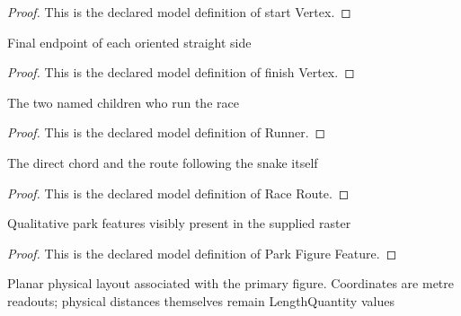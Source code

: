 \begin{proof}
  This is the declared model definition of start Vertex.
\end{proof}
\begin{definition}
  \label{def:physics:phyx-mini-0680:phyxminiproblems-problemphyxmini0680-snakeside-finishvertex}
  Final endpoint of each oriented straight side
\end{definition}
\begin{proof}
  This is the declared model definition of finish Vertex.
\end{proof}
\begin{definition}[Runner]
  \label{def:physics:phyx-mini-0680:phyxminiproblems-problemphyxmini0680-runner}
  The two named children who run the race
\end{definition}
\begin{proof}
  This is the declared model definition of Runner.
\end{proof}
\begin{definition}
  \label{def:physics:phyx-mini-0680:phyxminiproblems-problemphyxmini0680-raceroute}
  The direct chord and the route following the snake itself
\end{definition}
\begin{proof}
  This is the declared model definition of Race Route.
\end{proof}
\begin{definition}
  \label{def:physics:phyx-mini-0680:phyxminiproblems-problemphyxmini0680-parkfigurefeature}
  Qualitative park features visibly present in the supplied raster
\end{definition}
\begin{proof}
  This is the declared model definition of Park Figure Feature.
\end{proof}
\begin{definition}
  \label{def:physics:phyx-mini-0680:phyxminiproblems-problemphyxmini0680-snakeparkfigure}
  Planar physical layout associated with the primary figure. Coordinates are metre readouts; physical distances themselves remain LengthQuantity values
\end{definition}

